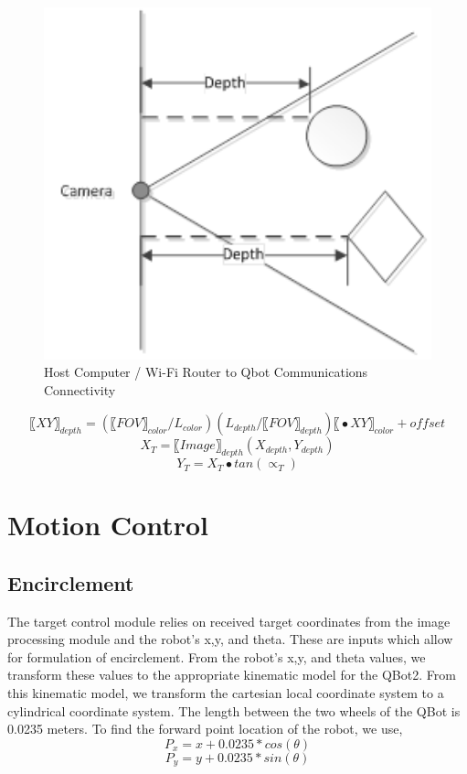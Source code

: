 \begin{figure}[htbp]
\begin{center}
\includegraphics[width=5in]{7}
\caption{Host Computer / Wi-Fi Router to Qbot Communications Connectivity} \label{fig:7}
\end{center}
\end{figure}

\begin{equation}
〖XY〗_{depth}=(〖FOV〗_{color}/L_{color} )(L_{depth}/〖FOV〗_{depth} ) 〖∙XY〗_{color}+offset
\end{equation}
\begin{equation}
X_T=〖Image〗_{depth} (X_{depth},Y_{depth})
\end{equation}
\begin{equation}
Y_T=X_T∙tan⁡(∝_T)
\end{equation}
\section{Motion Control}
\subsection{Encirclement}
The target control module relies on received target coordinates from the image processing module and the robot’s  x,y, and theta. These are inputs which allow for formulation of encirclement.  From the robot’s x,y, and theta values, we transform these values to the appropriate kinematic model for the QBot2. From this kinematic model, we transform the cartesian local coordinate system to a cylindrical coordinate system. The length between the two wheels of the QBot is 0.0235 meters. To find the forward point location of the robot, we use,
\begin{equation}
	P_x=x+0.0235*cos⁡(θ)
\end{equation}
\begin{equation}
	P_y=y+0.0235*sin⁡(θ)
\end{equation}

